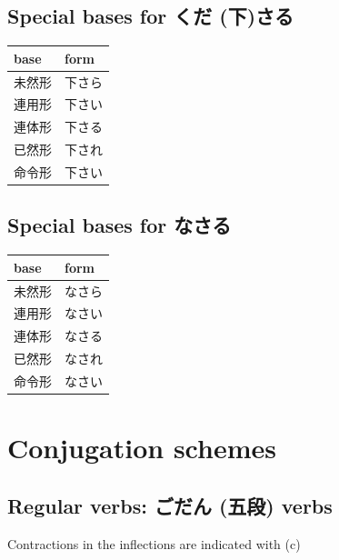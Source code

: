 \documentclass[11pt, b5paper, twoside, openright, onecolumn]{book}
\makeatletter
\newcommand*{\rubystack}[2]{{\relscale{0.5}%
  \begin{tabular}[b]{@{}c@{}}%
    {#1}\\%
   {\textscale{2}{#2}}%
  \end{tabular}}%
}
\DeclareRobustCommand*{\ruby}[2]{%
  \mbox{%
    \setlength{\parskip}{0ex}%
    \BeginAccSupp{method=pdfstringdef,ActualText={#1}}%
      \rubystack{\phantom{#2}}{#1}%
      \llap{%
        \rubystack{#2}{\phantom{#1}}%
      }%
    \EndAccSupp{}%
  }%
}
\renewcommand*{\ruby}[2]{#2 (#1)}%
\newenvironment{mytabular}[1]{\noindent\hspace{0.4in}
\begin{tabular}[h]{#1}}{\end{tabular}}
\makeatother
\begin{document}
\subsection{Special bases for \ruby{下}{くだ}さる}

\smaller
\begin{mytabular}{| l  l |}\hline 
\rule{0pt}{2.4ex}base & form\\ 
\hline
\rule{0pt}{2.4ex}未然形 & 下さら\\ 
\rule{0pt}{2.4ex}連用形 & 下さい\\ 
\rule{0pt}{2.4ex}連体形 & 下さる\\ 
\rule{0pt}{2.4ex}已然形 & 下され\\ 
\rule{0pt}{2.4ex}命令形 & 下さい\\ 
\hline 
\end{mytabular}
\larger

\subsection{Special bases for なさる}

\smaller
\begin{mytabular}{| l  l |}\hline 
\rule{0pt}{2.4ex}base & form\\ 
\hline
\rule{0pt}{2.4ex}未然形 & なさら\\ 
\rule{0pt}{2.4ex}連用形 & なさい\\ 
\rule{0pt}{2.4ex}連体形 & なさる\\ 
\rule{0pt}{2.4ex}已然形 & なされ\\ 
\rule{0pt}{2.4ex}命令形 & なさい\\ 
\hline 
\end{mytabular}
\larger
\section{Conjugation schemes}


\subsection{Regular verbs: \ruby{五段}{ごだん} verbs}

Contractions in the inflections are indicated with (c)
\end{document}
